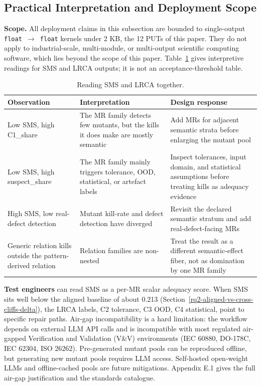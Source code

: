 \documentclass[manuscript,screen,review]{acmart}
\begin{document}
\subsection{Practical Interpretation and Deployment Scope}\label{stakeholder-analysis-single-output-kernels-scope}

\textbf{Scope.} All deployment claims in this subsection are bounded to
single-output \texttt{float\ $\to$\ float} kernels under 2 KB, the 12 PUTs
of this paper. They do not apply to industrial-scale, multi-module, or
multi-output scientific computing software, which lies beyond the scope of this paper.
Table~\ref{tab:sms-lrca-reading} gives interpretive readings for SMS and
LRCA outputs; it is not an acceptance-threshold table.

{%
\begin{longtable}[]{@{}
  >{\raggedright\arraybackslash}p{}
  >{\raggedright\arraybackslash}p{}
  >{\raggedright\arraybackslash}p{}@{}}
\caption{Reading SMS and LRCA together.}\label{tab:sms-lrca-reading}\\
\toprule\noalign{}
Observation & Interpretation & Design response \\
\midrule\noalign{}
\endfirsthead
\endhead
\bottomrule\noalign{}
\endlastfoot
Low SMS, high C1\_share & The MR family detects few mutants, but the
kills it does make are mostly semantic & Add MRs for adjacent semantic
strata before enlarging the mutant pool \\
Low SMS, high suspect\_share & The MR family mainly triggers tolerance,
OOD, statistical, or artefact labels & Inspect tolerances, input domain,
and statistical assumptions before treating kills as adequacy evidence \\
High SMS, low real-defect detection & Mutant kill-rate and defect
detection have diverged & Revisit the declared semantic stratum and add
real-defect-facing MRs \\
Generic relation kills outside the pattern-derived relation & Relation
families are non-nested & Treat the result as a different
semantic-effect fiber, not as domination by one MR family \\
\end{longtable}
}

\textbf{Test engineers} can read SMS as a per-MR scalar adequacy score.
When SMS sits well below the aligned baseline of about 0.213 (Section~\ref{rq2-aligned-vs-cross-cliffs-delta}), the
LRCA labels, C2 tolerance, C3 OOD, C4 statistical, point to specific
repair paths. Air-gap incompatibility is a hard limitation: the workflow
depends on external LLM API calls and is incompatible with most
regulated air-gapped Verification and Validation (V\&V) environments
(IEC 60880, DO-178C, IEC 62304, ISO 26262). Pre-generated mutant pools
can be reproduced offline, but generating new mutant pools requires LLM
access. Self-hosted open-weight LLMs and offline-cached pools are future
mitigations. Appendix E.1 gives the full air-gap justification and the
standards catalogue.
\end{document}
